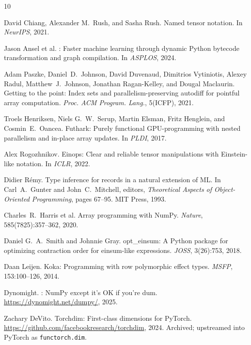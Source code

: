 \documentclass[acmsmall,nonacm,review]{acmart}
\begin{document}
\begin{thebibliography}{10}

David Chiang, Alexander M.\ Rush, and Sasha Rush.
\newblock Named tensor notation.
\newblock In \emph{NeurIPS}, 2021.

Jason Ansel et al.
: Faster machine learning through dynamic {Python}
  bytecode transformation and graph compilation.
\newblock In \emph{ASPLOS}, 2024.

Adam Paszke, Daniel~D.\ Johnson, David Duvenaud, Dimitrios Vytiniotis,
  Alexey Radul, Matthew~J.\ Johnson, Jonathan Ragan-Kelley, and Dougal
  Maclaurin.
\newblock Getting to the point: Index sets and parallelism-preserving
  autodiff for pointful array computation.
\newblock \emph{Proc. ACM Program. Lang.}, 5(ICFP), 2021.

Troels Henriksen, Niels G.~W.\ Serup, Martin Elsman, Fritz Henglein, and
  Cosmin~E.\ Oancea.
\newblock Futhark: Purely functional {GPU}-programming with nested
  parallelism and in-place array updates.
\newblock In \emph{PLDI}, 2017.

Alex Rogozhnikov.
\newblock Einops: Clear and reliable tensor manipulations with
  Einstein-like notation.
\newblock In \emph{ICLR}, 2022.

Didier R{\'e}my.
\newblock Type inference for records in a natural extension of {ML}.
\newblock In Carl~A.\ Gunter and John~C.\ Mitchell, editors, \emph{Theoretical
  Aspects of Object-Oriented Programming}, pages 67--95. MIT Press, 1993.

Charles~R.\ Harris et al.
\newblock Array programming with {NumPy}.
\newblock \emph{Nature}, 585(7825):357--362, 2020.

Daniel G.~A.\ Smith and Johnnie Gray.
\newblock opt\_einsum: A {Python} package for optimizing contraction order
  for einsum-like expressions.
\newblock \emph{JOSS}, 3(26):753, 2018.

Daan Leijen.
\newblock Koka: Programming with row polymorphic effect types.
\newblock \emph{MSFP}, 153:100--126, 2014.

Dynomight.
: {NumPy} except it's {OK} if you're dum.
\newblock \url{https://dynomight.net/dumpy/}, 2025.

Zachary DeVito.
\newblock Torchdim: First-class dimensions for {PyTorch}.
\newblock \url{https://github.com/facebookresearch/torchdim}, 2024.
\newblock Archived; upstreamed into PyTorch as \texttt{functorch.dim}.

\end{thebibliography}
\end{document}
